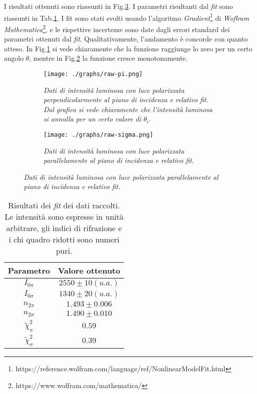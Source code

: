   I risultati ottenuti sono riassunti in Fig.\ref{fig:dati-raw}.
  I parametri risultanti dal \emph{fit} sono riassunti in Tab.\ref{tab:risultati-fit}.
  I fit sono stati svolti usando l'algoritmo \emph{Gradient}\footnote{https://reference.wolfram.com/language/ref/NonlinearModelFit.html} di \emph{Woflram Mathematica}\footnote{https://www.wolfram.com/mathematica/}, e le rispettive incertezze %
  sono date dagli errori standard dei parametri ottenuti dal \emph{fit}.                                          %
  Qualitativamente, l'andamento è concorde con quanto atteso. In Fig.\ref{fig:raw-pi}
  si vede chiaramente che la funzione raggiunge lo zero per un certo angolo $\theta$,
  mentre in Fig.\ref{fig:raw-sigma} la funzione cresce monotonamente.
  \begin{figure}[H]
    \centering
    \caption{Dati raccolti}
    \begin{subfigure}[t]{.4\textwidth}
      \texttt{[image: ./graphs/raw-pi.png]}
      \caption{
        \emph{
          Dati di intensità luminosa con luce polarizzata perpendicolarmente al
          piano di incidenza e relativo fit. Dal grafico si vede chiaramente che
          l'intensità luminosa si annulla per un certo valore di $\theta_i$.
        }
      }
      \label{fig:raw-pi}
    \end{subfigure}
    \hspace{20mm}
    \begin{subfigure}[t]{.4\textwidth}
      \texttt{[image: ./graphs/raw-sigma.png]}
      \caption{
        \emph{
          Dati di intensità luminosa con luce polarizzata parallelamente al
          piano di incidenza e relativo fit.
        }
      }
      \label{fig:raw-sigma}
    \end{subfigure}
    \label{fig:dati-raw}
  \end{figure}
  \begin{table}[ht]
    \centering
    \caption{
      Risultati dei \emph{fit} dei dati raccolti. Le intensità sono espresse in unità arbitrare, gli indici
      di rifrazione e i chi quadro ridotti sono numeri puri.
    }
    \begin{tabular}[t]{cc}
      \toprule
      Parametro &Valore ottenuto\\
      \midrule
      $I_{0\pi}$ &$2550 \pm 10 (u. a.)$ \\
      $I_{0\sigma}$ &$1340 \pm 20 (u. a.)$ \\
      $n_{2\pi}$ &$1.493 \pm 0.006$    \\
      $n_{2\sigma}$ &$1.490 \pm 0.010$    \\
      $\tilde \chi^2_\pi$ &$0.59$ \\
      $\tilde \chi^2_\sigma$ &$0.39$ \\
      \bottomrule
    \end{tabular}\label{tab:risultati-fit}
  \end{table}
